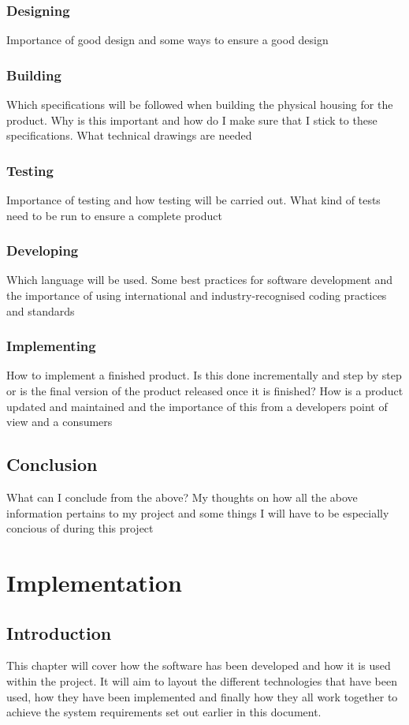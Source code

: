 \documentclass[10pt,a4paper]{article}
\begin{document}
\subsubsection{Designing}
Importance of good design and some ways to ensure a good design 
\subsubsection{Building}
Which specifications will be followed when building the physical housing for the product. Why is this important and how do I make sure that I stick to these specifications. What technical drawings are needed
\subsubsection{Testing}
Importance of testing and how testing will be carried out. What kind of tests need to be run to ensure a complete product
\subsubsection{Developing}
Which language will be used. Some best practices for software development and the importance of using international and industry-recognised coding practices and standards 
\subsubsection{Implementing}
How to implement a finished product. Is this done incrementally and step by step or is the final version of the product released once it is finished? How is a product updated and maintained and the importance of this from a developers point of view and a consumers



\subsection{Conclusion}
What can I conclude from the above? My thoughts on how all the above information pertains to my project and some things I will have to be especially concious of during this project 

\section{Implementation} 
\subsection{Introduction}
This chapter will cover how the software has been developed and how it is used within the project. It will aim to layout the different technologies that have been used, how they have been implemented and finally how they all work together to achieve the system requirements set out earlier in this document.
\end{document}
